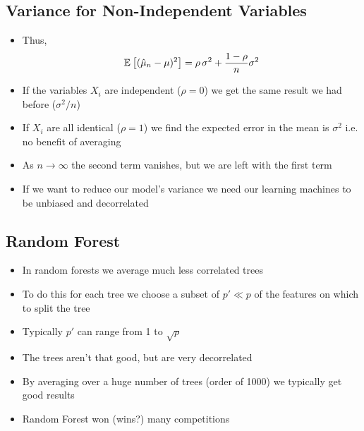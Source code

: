
\begin{slide}
\section[-1]{Variance for Non-Independent Variables}

\begin{PauseHighLight}
  \begin{itemize}
  \item Thus,
    \begin{align*}
      \mathbb{E}_{}\left[  (\hat{\mu}_n-\mu)^2  \right] =  \rho\,\sigma^2 + \frac{1-\rho}{n} \sigma^2
    \end{align*}
  \item If the variables $X_i$ are independent ($\rho=0$) we get the
    same result we had before ($\sigma^2/n$)\pause
  \item If $X_i$ are all identical ($\rho=1$) we find the expected
    error in the mean is $\sigma^2$\pause{} i.e. no benefit of averaging\pause
  \item As $n\rightarrow\infty$ the second term vanishes, but we are left
    with the first term\pause
  \item If we want to reduce our model's variance we need our
    learning machines to be unbiased and decorrelated\pause
  \end{itemize}
\end{PauseHighLight}

\end{slide}




\begin{slide}
\section{Random Forest}

\begin{PauseHighLight}
  \begin{itemize}
  \item In random forests we average much less correlated trees\pause
  \item To do this for each tree we choose a subset of $p'\ll p$ of the
    features on which to split the tree\pause
  \item Typically $p'$ can range from 1 to $\sqrt{p}$\pause
  \item The trees aren't that good, but are very decorrelated\pause
  \item By averaging over a huge number of trees (order of 1000) we
    typically get good results\pause
  \item Random Forest won (wins?) many competitions\pause
  \end{itemize}
\end{PauseHighLight}

\end{slide}


